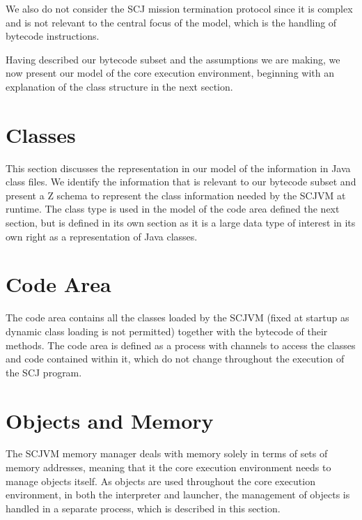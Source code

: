 We also do not consider the SCJ mission termination protocol since it
is complex and is not relevant to the central focus of the model,
which is the handling of bytecode instructions.

Having described our bytecode subset and the assumptions we are
making, we now present our model of the core execution environment,
beginning with an explanation of the class structure in the next
section.

\section{Classes}
\label{cee-classes-section}

This section discusses the representation in our model of the
information in Java class files.
We identify the information that is relevant to our bytecode subset
and present a Z schema to represent the class information needed by
the SCJVM at runtime.
The class type is used in the model of the code area defined the next
section, but is defined in its own section as it is a large data type
of interest in its own right as a representation of Java classes.



\section{Code Area}
\label{cee-code-area-section}

The code area contains all the classes loaded by the SCJVM (fixed at
startup as dynamic class loading is not permitted) together with the
bytecode of their methods.
The code area is defined as a \Circus{} process with channels to
access the classes and code contained within it, which do not change
throughout the execution of the SCJ program.



\section{Objects and Memory}
\label{cee-memory-section}

The SCJVM memory manager deals with memory solely in terms of sets of
memory addresses, meaning that it the core execution environment needs
to manage objects itself.
As objects are used throughout the core execution environment, in both
the interpreter and launcher, the management of objects is handled in
a separate \Circus{} process, which is described in this section.

